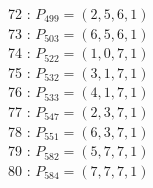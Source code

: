 \documentclass{article}
\begin{document}
{\begin{multicols}{3}
72 : $P_{499}=( 2, 5, 6, 1 )$\\
73 : $P_{503}=( 6, 5, 6, 1 )$\\
74 : $P_{522}=( 1, 0, 7, 1 )$\\
75 : $P_{532}=( 3, 1, 7, 1 )$\\
76 : $P_{533}=( 4, 1, 7, 1 )$\\
77 : $P_{547}=( 2, 3, 7, 1 )$\\
78 : $P_{551}=( 6, 3, 7, 1 )$\\
79 : $P_{582}=( 5, 7, 7, 1 )$\\
80 : $P_{584}=( 7, 7, 7, 1 )$\\
\end{multicols}


%


%


}%
\end{document}
